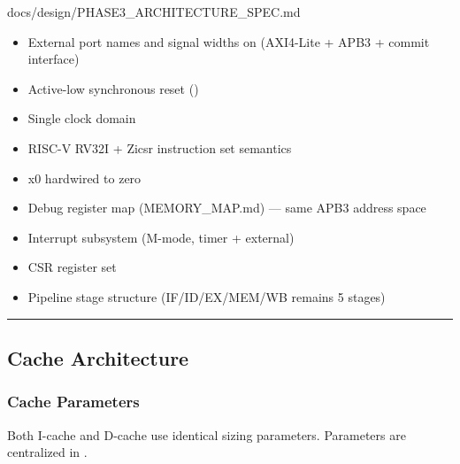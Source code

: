 \begin{relocated}{docs/design/PHASE3_ARCHITECTURE_SPEC.md}
\begin{itemize}
\tightlist
\item
  External port names and signal widths on 
  (AXI4-Lite + APB3 + commit interface)
\item
  Active-low synchronous reset ()
\item
  Single clock domain
\item
  RISC-V RV32I + Zicsr instruction set semantics
\item
  x0 hardwired to zero
\item
  Debug register map (MEMORY\_\allowbreak{}MAP.md) --- same APB3 address
  space
\item
  Interrupt subsystem (M-mode, timer + external)
\item
  CSR register set
\item
  Pipeline stage structure
  (IF/\allowbreak{}ID/\allowbreak{}EX/\allowbreak{}MEM/\allowbreak{}WB
  remains 5 stages)
\end{itemize}

\begin{center}\rule{0.5\linewidth}{0.5pt}\end{center}

\subsection{Cache Architecture}\label{ds:ch:phase3-architecture:2-cache-architecture}

\subsubsection{Cache Parameters}\label{ds:ch:phase3-architecture:21-cache-parameters}

Both I-cache and D-cache use identical sizing parameters. Parameters are
centralized in .

{\small\setlength{\tabcolsep}{4pt}

}
\end{relocated}
